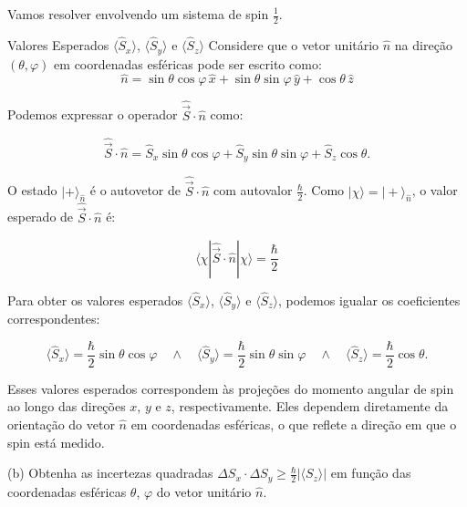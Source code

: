 \documentclass[12pt]{article}
\begin{document}
\begin{enumerate}
Vamos resolver envolvendo um sistema de spin \(\frac{1}{2}\).

Valores Esperados \(\langle \hat{S}_x \rangle\), \(\langle \hat{S}_y \rangle\) e \(\langle \hat{S}_z \rangle\) 
Considere que o vetor unitário \(\hat{n}\) na direção \((\theta, \varphi)\) em coordenadas esféricas pode ser escrito como:
\begin{equation}
    \hat{n} = \sin\theta \cos\varphi \, \hat{x} + \sin\theta \sin\varphi \, \hat{y} + \cos\theta \, \hat{z}
\end{equation}

Podemos expressar o operador \(\hat{\vec{S}} \cdot \hat{n}\) como:

\begin{equation}
  \hat{\vec{S}} \cdot \hat{n} = \hat{S}_x \sin\theta \cos\varphi + \hat{S}_y \sin\theta \sin\varphi + \hat{S}_z \cos\theta.  
\end{equation}

O estado \(|+\rangle_{\hat{n}}\) é o autovetor de \(\hat{\vec{S}} \cdot \hat{n}\) com autovalor \(\frac{\hbar}{2}\). Como \(|\chi\rangle = |+\rangle_{\hat{n}}\), o valor esperado de \(\hat{\vec{S}} \cdot \hat{n}\) é:

\begin{equation}
 \langle \chi | \hat{\vec{S}} \cdot \hat{n} | \chi \rangle = \frac{\hbar}{2}   
\end{equation}

Para obter os valores esperados \(\langle \hat{S}_x \rangle\), \(\langle \hat{S}_y \rangle\) e \(\langle \hat{S}_z \rangle\), podemos igualar os coeficientes correspondentes:

\begin{equation}
\langle \hat{S}_x \rangle = \frac{\hbar}{2} \sin\theta \cos\varphi \quad \wedge \quad  
\langle \hat{S}_y \rangle = \frac{\hbar}{2} \sin\theta \sin\varphi \quad \wedge  \quad
\langle \hat{S}_z \rangle = \frac{\hbar}{2} \cos\theta.
\end{equation}

Esses valores esperados correspondem às projeções do momento angular de spin ao longo das direções \(x\), \(y\) e \(z\), respectivamente. Eles dependem diretamente da orientação do vetor \(\hat{n}\) em coordenadas esféricas, o que reflete a direção em que o spin está medido.

(b) Obtenha as incertezas quadradas $\Delta S_x \cdot \Delta S_y \geq \frac{\hbar}{2} |\langle S_z \rangle|$ em função das coordenadas esféricas $\theta$, $\varphi$ do vetor unitário $\hat{n}$.


\end{enumerate}
\end{document}
